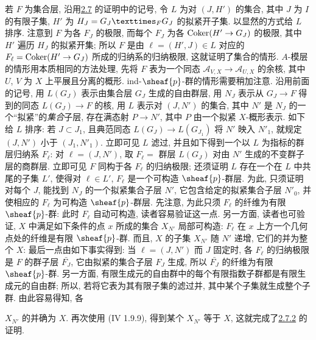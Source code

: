 若 $F$ 为集合层, 沿用\hyperref[IX.prop2.7]{2.7} 的证明中的记号,
令 $L$ 为对 $(J,H')$ 的集合, 其中 $J$ 为 $I$ 的有限子集,
$H'$ 为 $H_J=\fprod{G_J}{G_J}{F}$ 的拟紧开子集.
以显然的方式给 $L$ 排序.
注意到 $F$ 为各 $F_J$ 的极限,
而每个 $F_J$ 为各 $\operatorname{Coker}(H'\rightarrow G_J)$ 的极限,
其中 $H'$ 遍历 $H_J$ 的拟紧开集;
所以 $F$ 是由 $\ell=(H',J)\in L$ 对应的
$F_{\ell}=\operatorname{Coker}(H'\rightarrow G_J)$ 所成的归纳系的归纳极限,
这就证明了集合的情形.
$A$-模层的情形用本质相同的方法处理,
先将 $F$ 表为一个同态 $𝒜_{V,X}\rightarrow 𝒜_{U,X}$ 的余核,
其中 $U$, $V$ 为 $X$ 上平展且分离的概形.
ind-$\sheaf{p}$-群的情形需要稍加注意.
沿用前面的记号, 用 $L(G_J)$ 表示由集合层 $G_J$ 生成的自由群层,
用 $N_J$ 表示从 $G_J\rightarrow F$ 得到的同态 $L(G_J)\rightarrow F$ 的核,
用 $L$ 表示对 $(J,N')$ 的集合,
其中 $N'$ 是 $N_J$ 的一个“拟紧”的\emph{集合}子层,
\ie 存在满态射 $P\rightarrow N'$, 其中 $P$ 由一个拟紧 $X$-概形表示.
如下给 $L$ 排序: 若 $J\subset J_1$,
且典范\pageoriginale 同态 $L(G_J)\rightarrow L(G_{J_1})$
将 $N'$ 映入 $N'_1$, 就规定 $(J,N')$ 小于 $(J_1, N'_1)$.
立即可见 $L$ 滤过, 并且如下得到一个以 $L$ 为指标的群层归纳系 $F_{\ell}$:
对 $\ell=(J,N')$, 取 $F_{\ell}=$ 群层 $L(G_J)$
对由 $N'$ 生成的不变群子层的商群层.
立即可见 $F$ 同构于各 $F_{\ell}$ 的归纳极限;
还须证明 $L$ 存在一个在 $L$ 中共尾的子集 $L'$, 使得对 $\ell\in L'$,
$F_{\ell}$ 是一个可构造 $\sheaf{p}$-群层.
为此, 只须证明对每个 $J$, 能找到 $N_J$ 的一个拟紧集合子层 $N'$,
它包含给定的拟紧集合子层 $N'_0$,
并使相应的 $F_{\ell}$ 为可构造 $\sheaf{p}$-群层.
先注意, 为此只须 $F_{\ell}$ 的纤维为有限 $\sheaf{p}$-群:
此时 $F_{\ell}$ 自动可构造, 读者容易验证这一点.
另一方面, 读者也可验证, $X$ 中满足如下条件的点 $x$ 所成的集合 $X_{N'}$
局部可构造: $F_{\ell}$ 在 $x$ 上方一个几何点处的纤维是有限 $\sheaf{p}$-群.
而且, $X$ 的子集 $X_{N'}$ 随 $N'$ 递增,
它们的并为整个 $X$:
最后一点由如下事实得到: 当 $\ell=(J,N')$ 而 $J$ 固定时,
各 $F_{\ell}$ 的归纳极限是 $F$ 的群子层 $\bar{F_J}$,
它由拟紧的集合子层 $F_J$ 生成,
所以 $\bar{F_J}$ 的纤维为有限 $\sheaf{p}$-群.
另一方面, 有限生成元的自由群中的每个有限指数子群都是有限生成元的自由群;
所以, 若将它表为其有限子集的滤过并, 其中某个子集就生成整个子群.
由此容易得知, 各



$X_{N'}$ 的并确为 $X$.
再次使用 (\EGA IV 1.9.9), 得到某个 $X_{N'}$ 等于 $X$,
这就完成了\hyperref[IX.cor2.7.2]{2.7.2} 的证明.

